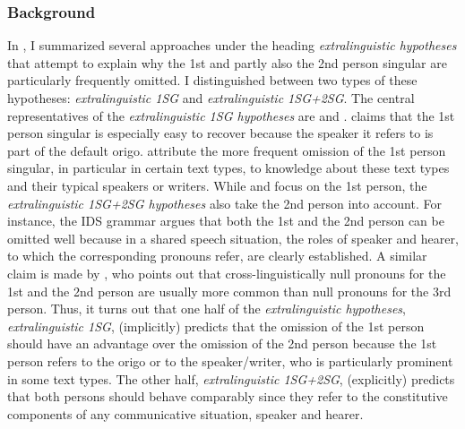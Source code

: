 \subsubsection{Background}
In , I summarized several approaches under the heading \textit{extralinguistic hypotheses} that attempt to explain why the 1st and partly also the 2nd person singular are particularly frequently omitted.
I distinguished between two types of these hypotheses: \textit{extralinguistic 1SG} and \textit{extralinguistic 1SG+2SG}.
The central representatives of the \textit{extralinguistic 1SG hypotheses} are \citet{imo2013,imo2014} and \citet{volodina.onea2012}.
\citet[153--154]{imo2014} claims that the 1st person singular is especially easy to recover  because the speaker it refers to is part of the default origo.
\citet[218]{volodina.onea2012} attribute the more frequent omission of the 1st person singular, in particular in certain text types, to knowledge about these text types and their typical speakers or writers.
While \citet{imo2013, imo2014} and \citet{volodina.onea2012} focus on the 1st person, the \textit{extralinguistic 1SG+2SG hypotheses} also take the 2nd person into account.
For instance, the IDS grammar \citep[414]{zifonun.etal1997} argues that both the 1st and the 2nd person can be omitted well because in a shared speech situation, the roles of speaker and hearer, to which the corresponding pronouns refer, are clearly established.
A similar claim is made by \citet[47]{ariel1990}, who points out that cross\hyp linguistically null pronouns for the 1st and the 2nd person are usually more common than null pronouns for the 3rd person.
Thus, it turns out that one half of the \textit{extralinguistic hypotheses}, \textit{extralinguistic 1SG}, (implicitly) predicts that the omission of the 1st person should have an advantage over the omission of the 2nd person because the 1st person refers to the origo or to the speaker/writer, who is particularly prominent in some text types.
The other half, \textit{extralinguistic 1SG+2SG}, (explicitly) predicts that both persons should behave comparably since they refer to the constitutive components of any communicative situation, speaker and hearer.

